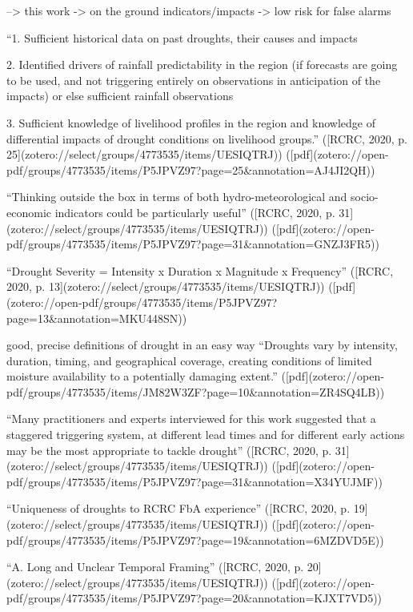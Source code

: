 {--> this work -> on the ground indicators/impacts -> low risk for false alarms

“1. Sufficient historical data on past droughts, their causes and impacts 

2. Identified drivers of rainfall predictability in the region (if forecasts are going to be used, and not triggering entirely on observations in anticipation of the impacts) or else sufficient rainfall observations 

3. Sufficient knowledge of livelihood profiles in the region and knowledge of differential impacts of drought conditions on livelihood groups.” ([RCRC, 2020, p. 25](zotero://select/groups/4773535/items/UESIQTRJ)) ([pdf](zotero://open-pdf/groups/4773535/items/P5JPVZ97?page=25&annotation=AJ4JI2QH))




“Thinking outside the box in terms of both hydro-meteorological and socio-economic indicators could be particularly useful” ([RCRC, 2020, p. 31](zotero://select/groups/4773535/items/UESIQTRJ)) ([pdf](zotero://open-pdf/groups/4773535/items/P5JPVZ97?page=31&annotation=GNZJ3FR5))


“Drought Severity = Intensity x Duration x Magnitude x Frequency” ([RCRC, 2020, p. 13](zotero://select/groups/4773535/items/UESIQTRJ)) ([pdf](zotero://open-pdf/groups/4773535/items/P5JPVZ97?page=13&annotation=MKU448SN))


good, precise definitions of drought in an easy way
“Droughts vary by intensity, duration, timing, and geographical coverage, creating conditions of limited moisture availability to a potentially damaging extent.” ([pdf](zotero://open-pdf/groups/4773535/items/JM82W3ZF?page=10&annotation=ZR4SQ4LB))

“Many practitioners and experts interviewed for this work suggested that a staggered triggering system, at different lead times and for different early actions may be the most appropriate to tackle drought” ([RCRC, 2020, p. 31](zotero://select/groups/4773535/items/UESIQTRJ)) ([pdf](zotero://open-pdf/groups/4773535/items/P5JPVZ97?page=31&annotation=X34YUJMF))


“Uniqueness of droughts to RCRC FbA experience” ([RCRC, 2020, p. 19](zotero://select/groups/4773535/items/UESIQTRJ)) ([pdf](zotero://open-pdf/groups/4773535/items/P5JPVZ97?page=19&annotation=6MZDVD5E))

“A. Long and Unclear Temporal Framing” ([RCRC, 2020, p. 20](zotero://select/groups/4773535/items/UESIQTRJ)) ([pdf](zotero://open-pdf/groups/4773535/items/P5JPVZ97?page=20&annotation=KJXT7VD5))

}
